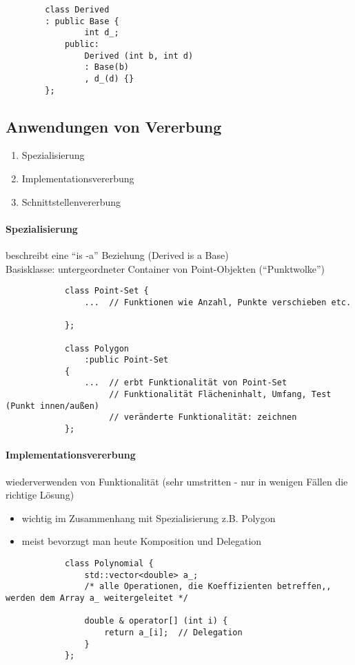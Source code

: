 \documentclass{article}
\begin{document}
\begin{itemize}
\begin{itemize}
\begin{lstlisting}
		class Derived
		: public Base {
				int d_;
			public:
				Derived (int b, int d)
				: Base(b)
				, d_(d) {}
		};
		\end{lstlisting}
	\end{itemize}
\subsection*{Anwendungen von Vererbung}
	\begin{enumerate}
		\item Spezialisierung
		\item Implementationsvererbung
		\item Schnittstellenvererbung
	\end{enumerate}
	\paragraph*{Spezialisierung}
		beschreibt eine ``is -a'' Beziehung (Derived is a Base) \\
		Basisklasse: untergeordneter Container von Point-Objekten (``Punktwolke'')
		\begin{lstlisting}
			class Point-Set {
				...  // Funktionen wie Anzahl, Punkte verschieben etc.

			};

			class Polygon
				:public Point-Set
			{
				...  // erbt Funktionalität von Point-Set
					 // Funktionalität Flächeninhalt, Umfang, Test (Punkt innen/außen)
					 // veränderte Funktionalität: zeichnen
			};
		\end{lstlisting}
	\paragraph*{Implementationsvererbung}
		wiederverwenden von Funktionalität (sehr umstritten - nur in wenigen Fällen die richtige Lösung) \\
		\begin{itemize}
			\item wichtig im Zusammenhang mit Spezialisierung z.B. Polygon
			\item meist bevorzugt man heute Komposition und Delegation
		\end{itemize}
		\begin{lstlisting}
			class Polynomial {
				std::vector<double> a_;
				/* alle Operationen, die Koeffizienten betreffen,, werden dem Array a_ weitergeleitet */

				double & operator[] (int i) {
					return a_[i];  // Delegation
				}
			};


\end{lstlisting}
\end{itemize}
\end{document}
